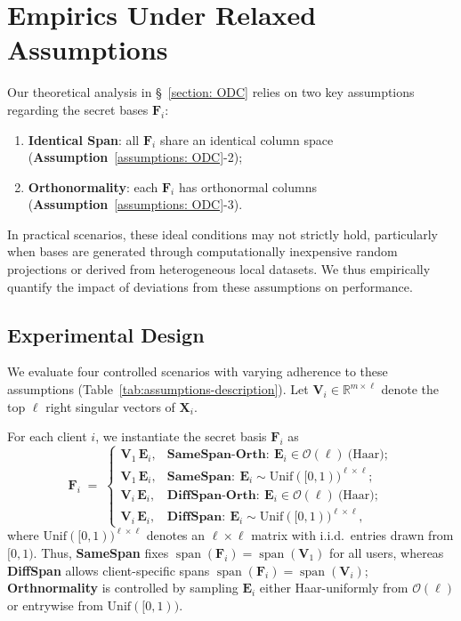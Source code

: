 \documentclass[final,3p,times]{elsarticle}
\theoremstyle{plain}
\newcommand{\matr}[1]{\bm{#1}}        %
\begin{document}
\section{Empirics Under Relaxed Assumptions}
\label{sec: assumptions-evaluation}

Our theoretical analysis in \S~\ref{section: ODC} relies on two key assumptions regarding the secret bases \(\matr{F}_i\):

\begin{enumerate}
    \item \textbf{Identical Span}: all $\matr{F}_i$ share an identical column space (\textbf{Assumption}~\ref{assumptions: ODC}-2);
    \item \textbf{Orthonormality}: each $\matr{F}_i$ has orthonormal columns (\textbf{Assumption}~\ref{assumptions: ODC}-3).
\end{enumerate}

In practical scenarios, these ideal conditions may not strictly hold, particularly when bases are generated through computationally inexpensive random projections or derived from heterogeneous local datasets. We thus empirically quantify the impact of deviations from these assumptions on performance.

\subsection{Experimental Design}  
We evaluate four controlled scenarios with varying adherence to these assumptions (Table~\ref{tab:assumptions-description}). Let $\matr{V}_i\in\mathbb{R}^{m\times\ell}$ denote the top $\ell$ right singular vectors of $\matr{X}_i$.

For each client $i$, we instantiate the secret basis $\matr{F}_i$ as
\begin{equation}
\matr{F}_i \;=\;
\begin{cases}
\matr{V}_1\,\matr{E}_i, & \textbf{SameSpan-Orth}:~\matr{E}_i \in \mathcal{O}(\ell)\ \text{(Haar)};\\[2pt]
\matr{V}_1\,\matr{E}_i, & \textbf{SameSpan}:~\matr{E}_i \sim \mathrm{Unif}([0,1))^{\ell\times \ell};\\[2pt]
\matr{V}_i\,\matr{E}_i, & \textbf{DiffSpan-Orth}:~\matr{E}_i \in \mathcal{O}(\ell)\ \text{(Haar)};\\[2pt]
\matr{V}_i\,\matr{E}_i, & \textbf{DiffSpan}:~\matr{E}_i \sim \mathrm{Unif}([0,1))^{\ell\times \ell},
\end{cases}
\end{equation}
where $\mathrm{Unif}([0,1))^{\ell\times\ell}$ denotes an $\ell\times\ell$ matrix with i.i.d.\ entries drawn from $[0,1)$. 
Thus, \textbf{SameSpan} fixes $\operatorname{span}(\matr{F}_i)=\operatorname{span}(\matr{V}_1)$ for all users, whereas \textbf{DiffSpan} allows client-specific spans $\operatorname{span}(\matr{F}_i)=\operatorname{span}(\matr{V}_i)$; \textbf{Orthnormality} is controlled by sampling $\matr{E}_i$ either Haar-uniformly from $\mathcal{O}(\ell)$ or entrywise from $\mathrm{Unif}([0,1))$.
\end{document}
